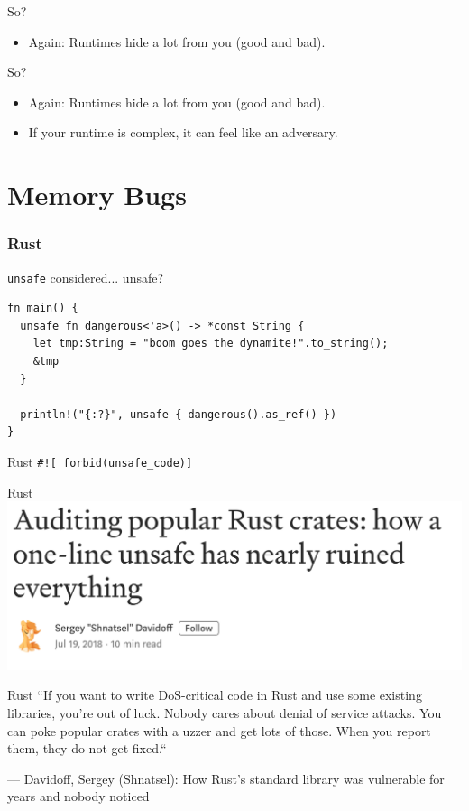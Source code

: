 \documentclass[aspectratio=169,14pt]{beamer}
\begin{document}
  \begin{frame}{So?}
    \begin{itemize}
      \item Again: Runtimes hide a lot from you (good and bad).
    \end{itemize}
  \end{frame}
  \begin{frame}{So?}
    \begin{itemize}
      \item Again: Runtimes hide a lot from you (good and bad).
      \item If your runtime is complex, it can feel like an adversary.
    \end{itemize}
  \end{frame}
  \section{Memory Bugs}
  \begin{frame}[fragile]
    \frametitle{Rust}
    \begin{listing}[H]
      \caption{\texttt{unsafe} considered... unsafe?}
      \begin{verbatim}
fn main() {
  unsafe fn dangerous<'a>() -> *const String {
    let tmp:String = "boom goes the dynamite!".to_string();
    &tmp
  }

  println!("{:?}", unsafe { dangerous().as_ref() })
}
      \end{verbatim}
    \end{listing}
  \end{frame}
  \begin{frame}{Rust}
    \texttt{\#![\,forbid(unsafe\_code)]\,}
  \end{frame}
  \begin{frame}{Rust}
    \includegraphics[width=14cm]{auditing_rust_crates}
  \end{frame}
  \begin{frame}{Rust}
    ``If you want to write DoS-critical code in Rust and use some existing
    libraries, you’re out of luck. Nobody cares about denial of service attacks.
    You can poke popular crates with a uzzer and get lots of those. When you report them, they do not get fixed.``

    --- Davidoff, Sergey (Shnatsel): How Rust’s standard library was vulnerable for years and nobody noticed
  \end{frame}
\end{document}
